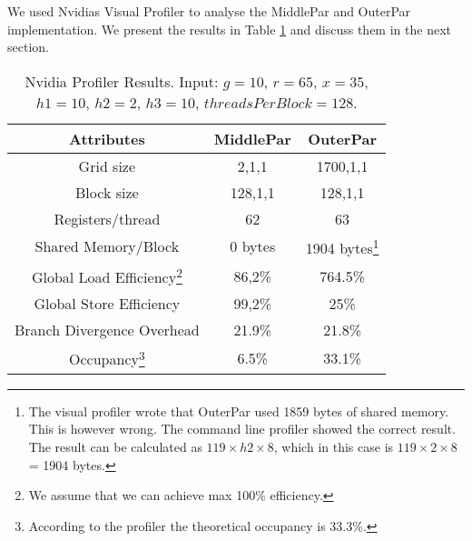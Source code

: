 We used Nvidias Visual Profiler to analyse the MiddlePar and OuterPar implementation. We present the results in Table \ref{table:profiler} and discuss them in the next section.
\begin{savenotes}
\begin{table}  
\begin{center}
\begin{tabular}[t]{|c|c|c|}
	\hline
\textbf{Attributes} & \textbf{MiddlePar} & \textbf{OuterPar} \\\hline
Grid size  & 2,1,1 & 1700,1,1\\\hline
Block size & 128,1,1&128,1,1\\\hline
Registers/thread & 62&63\\\hline
Shared Memory/Block &0 bytes& 1904 bytes\footnote{The visual profiler wrote that OuterPar used 1859 bytes of shared memory. This is however wrong. The command line profiler showed the correct result. The result can be calculated as $119 \times h2 \times 8$, which in this case is $119 \times 2 \times8$ = 1904 bytes.}\\\hline
Global Load Efficiency\footnote{We assume that we can achieve max 100\% efficiency.}&86,2\%&764.5\%\\\hline
Global Store Efficiency&99,2\%&25\%\\\hline
Branch Divergence Overhead&21.9\%& 21.8\%\\\hline
Occupancy\footnote{According to the profiler the theoretical occupancy is 33.3\%.}&6.5\%&33.1\%\\\hline
\end{tabular}
\end{center}
\caption{Nvidia Profiler Results. Input: $g=10$, $r=65$, $x=35$, $h1=10$, $h2=2$, $h3=10$, $threadsPerBlock=128$.}
\label{table:profiler}
\end{table}
\end{savenotes}

